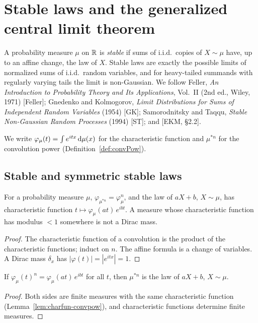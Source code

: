 \chapter{Stable laws and the generalized central limit theorem}
\label{chap:stable-laws}

A probability measure $\mu$ on $\mathbb{R}$ is \emph{stable} if sums of i.i.d.\ copies of $X \sim \mu$
have, up to an affine change, the law of $X$. Stable laws are exactly the possible limits of
normalized sums of i.i.d.\ random variables, and for heavy-tailed summands with regularly varying
tails the limit is non-Gaussian. We follow Feller, \emph{An Introduction to Probability Theory
and Its Applications}, Vol.~II (2nd ed., Wiley, 1971) [Feller]; Gnedenko and Kolmogorov,
\emph{Limit Distributions for Sums of Independent Random Variables} (1954) [GK]; Samorodnitsky
and Taqqu, \emph{Stable Non-Gaussian Random Processes} (1994) [ST]; and [EKM, \S2.2].

We write $\varphi_\mu(t) = \int e^{itx} \, \mathrm{d} \mu(x)$ for the characteristic function and
$\mu^{*n}$ for the convolution power (Definition~\ref{def:convPow}).

\section{Stable and symmetric stable laws}

\begin{lemma}
  \label{lem:charfun-convpow}
  \leanok
  For a probability measure $\mu$, $\varphi_{\mu^{*n}} = \varphi_\mu^n$, and the law of $aX + b$,
  $X \sim \mu$, has characteristic function $t \mapsto \varphi_\mu(a t) \, e^{i b t}$. A measure
  whose characteristic function has modulus $< 1$ somewhere is not a Dirac mass.
\end{lemma}
\begin{proof}
  \leanok
  The characteristic function of a convolution is the product of the characteristic functions;
  induct on $n$. The affine formula is a change of variables. A Dirac mass $\delta_x$ has
  $|\varphi(t)| = |e^{itx}| = 1$.
\end{proof}

\begin{lemma}
  \label{lem:convpow-eq-map-of-charfun}
  \leanok
  If $\varphi_\mu(t)^n = \varphi_\mu(a t) \, e^{i b t}$ for all $t$, then $\mu^{*n}$ is the law
  of $aX + b$, $X \sim \mu$.
\end{lemma}
\begin{proof}
  \leanok
  Both sides are finite measures with the same characteristic function
  (Lemma~\ref{lem:charfun-convpow}), and characteristic functions determine finite measures.
\end{proof}


